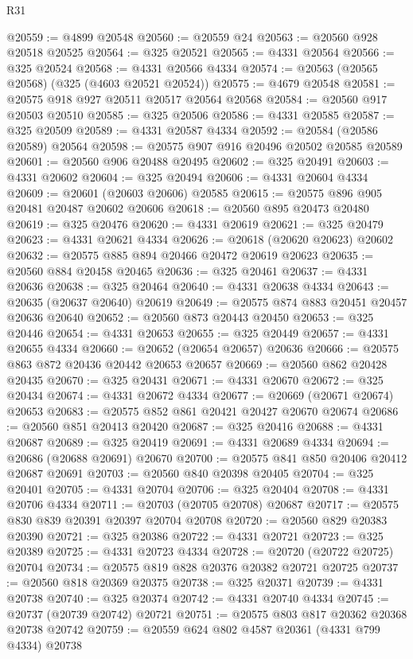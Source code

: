 \begin{lexlean}{R31}
\begin{coremodule}
@20559 := @4899 @20548
@20560 := @20559 @24
@20563 := @20560 @928 @20518 @20525
@20564 := @325 @20521
@20565 := @4331 @20564
@20566 := @325 @20524
@20568 := @4331 @20566 @4334
@20574 := @20563 (@20565 @20568) (@325 (@4603 @20521 @20524))
@20575 := @4679 @20548
@20581 := @20575 @918 @927 @20511 @20517 @20564 @20568
@20584 := @20560 @917 @20503 @20510
@20585 := @325 @20506
@20586 := @4331 @20585
@20587 := @325 @20509
@20589 := @4331 @20587 @4334
@20592 := @20584 (@20586 @20589) @20564
@20598 := @20575 @907 @916 @20496 @20502 @20585 @20589
@20601 := @20560 @906 @20488 @20495
@20602 := @325 @20491
@20603 := @4331 @20602
@20604 := @325 @20494
@20606 := @4331 @20604 @4334
@20609 := @20601 (@20603 @20606) @20585
@20615 := @20575 @896 @905 @20481 @20487 @20602 @20606
@20618 := @20560 @895 @20473 @20480
@20619 := @325 @20476
@20620 := @4331 @20619
@20621 := @325 @20479
@20623 := @4331 @20621 @4334
@20626 := @20618 (@20620 @20623) @20602
@20632 := @20575 @885 @894 @20466 @20472 @20619 @20623
@20635 := @20560 @884 @20458 @20465
@20636 := @325 @20461
@20637 := @4331 @20636
@20638 := @325 @20464
@20640 := @4331 @20638 @4334
@20643 := @20635 (@20637 @20640) @20619
@20649 := @20575 @874 @883 @20451 @20457 @20636 @20640
@20652 := @20560 @873 @20443 @20450
@20653 := @325 @20446
@20654 := @4331 @20653
@20655 := @325 @20449
@20657 := @4331 @20655 @4334
@20660 := @20652 (@20654 @20657) @20636
@20666 := @20575 @863 @872 @20436 @20442 @20653 @20657
@20669 := @20560 @862 @20428 @20435
@20670 := @325 @20431
@20671 := @4331 @20670
@20672 := @325 @20434
@20674 := @4331 @20672 @4334
@20677 := @20669 (@20671 @20674) @20653
@20683 := @20575 @852 @861 @20421 @20427 @20670 @20674
@20686 := @20560 @851 @20413 @20420
@20687 := @325 @20416
@20688 := @4331 @20687
@20689 := @325 @20419
@20691 := @4331 @20689 @4334
@20694 := @20686 (@20688 @20691) @20670
@20700 := @20575 @841 @850 @20406 @20412 @20687 @20691
@20703 := @20560 @840 @20398 @20405
@20704 := @325 @20401
@20705 := @4331 @20704
@20706 := @325 @20404
@20708 := @4331 @20706 @4334
@20711 := @20703 (@20705 @20708) @20687
@20717 := @20575 @830 @839 @20391 @20397 @20704 @20708
@20720 := @20560 @829 @20383 @20390
@20721 := @325 @20386
@20722 := @4331 @20721
@20723 := @325 @20389
@20725 := @4331 @20723 @4334
@20728 := @20720 (@20722 @20725) @20704
@20734 := @20575 @819 @828 @20376 @20382 @20721 @20725
@20737 := @20560 @818 @20369 @20375
@20738 := @325 @20371
@20739 := @4331 @20738
@20740 := @325 @20374
@20742 := @4331 @20740 @4334
@20745 := @20737 (@20739 @20742) @20721
@20751 := @20575 @803 @817 @20362 @20368 @20738 @20742
@20759 := @20559 @624 @802 @4587 @20361 (@4331 @799 @4334) @20738

\end{coremodule}
\end{lexlean}
